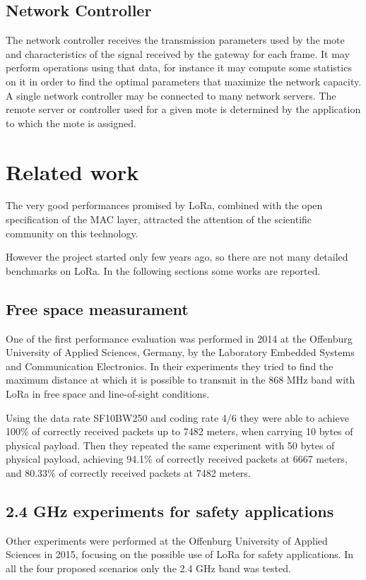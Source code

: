 \subsection{Network Controller}
The network controller receives the transmission parameters used by the mote and characteristics of the signal received by the gateway for each frame. It may perform operations using that data, for instance it may compute some statistics on it in order to find the optimal parameters that maximize the network capacity.
A single network controller may be connected to many network servers. The remote server or controller used for a given mote is determined by the application to which the mote is assigned.


\section{Related work}
The very good performances promised by LoRa, combined with the open specification of the MAC layer, attracted the attention of the scientific community on this technology. 

However the project started only few years ago, so there are not many detailed benchmarks on LoRa. In the following sections some works are reported.

\subsection{Free space measurament}
One of the first performance evaluation was performed in 2014 at the Offenburg University of Applied Sciences, Germany, by the Laboratory Embedded Systems and Communication Electronics. In their experiments they tried to find the maximum distance at which it is possible to transmit in the 868 MHz band with LoRa in free space and line-of-sight conditions.

Using the data rate SF10BW250 and coding rate 4/6 they were able to achieve 100\% of correctly received packets up to 7482 meters, when carrying 10 bytes of physical payload. Then they repeated the same experiment with 50 bytes of physical payload, achieving 94.1\% of correctly received packets at 6667 meters, and 80.33\% of correctly received packets at 7482 meters.\cite{freespace}


\subsection{2.4 GHz experiments for safety applications}
Other experiments were performed at the Offenburg University of Applied Sciences in 2015, focusing on the possible use of LoRa for safety applications. In all the four proposed scenarios only the 2.4 GHz band was tested.

